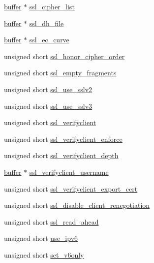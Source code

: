 \begin{DoxyCompactItemize}
\hyperlink{structbuffer}{buffer} $\ast$ \hyperlink{structspecific__config_a6e765e3d0beaa12ed101cf35fd111071}{ssl\-\_\-cipher\-\_\-list}
\item 
\hyperlink{structbuffer}{buffer} $\ast$ \hyperlink{structspecific__config_aa83b500cff1eb7ab57815cabd2190986}{ssl\-\_\-dh\-\_\-file}
\item 
\hyperlink{structbuffer}{buffer} $\ast$ \hyperlink{structspecific__config_ab4c26faf85636a8fdfb486ffe6fe83cd}{ssl\-\_\-ec\-\_\-curve}
\item 
unsigned short \hyperlink{structspecific__config_a9f682341f897cb76de7259fbfd5c8902}{ssl\-\_\-honor\-\_\-cipher\-\_\-order}
\item 
unsigned short \hyperlink{structspecific__config_a785e41f7c56e26b8d217e61113653c32}{ssl\-\_\-empty\-\_\-fragments}
\item 
unsigned short \hyperlink{structspecific__config_a5949f421dc6a58473b4805ce95ab1606}{ssl\-\_\-use\-\_\-sslv2}
\item 
unsigned short \hyperlink{structspecific__config_acc3e5c4fa553cd799eca498b787e3d12}{ssl\-\_\-use\-\_\-sslv3}
\item 
unsigned short \hyperlink{structspecific__config_af5d7a81fb26d0388671dffa83c77ad48}{ssl\-\_\-verifyclient}
\item 
unsigned short \hyperlink{structspecific__config_a34e09eb071c50962e7a0d33017e69969}{ssl\-\_\-verifyclient\-\_\-enforce}
\item 
unsigned short \hyperlink{structspecific__config_a37061028773171cbd1044b641b4c057c}{ssl\-\_\-verifyclient\-\_\-depth}
\item 
\hyperlink{structbuffer}{buffer} $\ast$ \hyperlink{structspecific__config_ac782e8a76d804008bdbc879de4be7a67}{ssl\-\_\-verifyclient\-\_\-username}
\item 
unsigned short \hyperlink{structspecific__config_a944ab1b079871adfa33aad8ac9f6a5e2}{ssl\-\_\-verifyclient\-\_\-export\-\_\-cert}
\item 
unsigned short \hyperlink{structspecific__config_a3b97c2b605c64a378d4e8febfc43aa74}{ssl\-\_\-disable\-\_\-client\-\_\-renegotiation}
\item 
unsigned short \hyperlink{structspecific__config_aa025af6d7a5daad4ef02910516eea930}{ssl\-\_\-read\-\_\-ahead}
\item 
unsigned short \hyperlink{structspecific__config_a187947aee4cd98be178d5e24d3602098}{use\-\_\-ipv6}
\item 
unsigned short \hyperlink{structspecific__config_a27873c71fdc9f8c23aff4dff3dcb2abe}{set\-\_\-v6only}

\end{DoxyCompactItemize}
